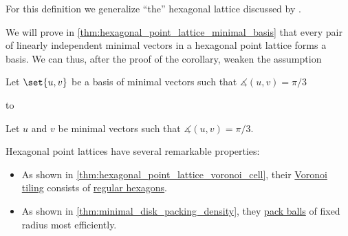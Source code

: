 \begin{comments}
  \item For this definition we generalize \enquote{the} hexagonal lattice discussed by \textcite[\S 6.2]{ConwaySloane1998SpherePackings}.

  \item We will prove in \cref{thm:hexagonal_point_lattice_minimal_basis} that every pair of linearly independent minimal vectors in a hexagonal point lattice forms a basis. We can thus, after the proof of the corollary, weaken the assumption
  \begin{displayquote}
    Let \( \set{ u, v } \) be a basis of minimal vectors such that \( \measuredangle(u, v) = \pi / 3 \)
  \end{displayquote}
  to
  \begin{displayquote}
    Let \( u \) and \( v \) be minimal vectors such that \( \measuredangle(u, v) = \pi / 3 \).
  \end{displayquote}

  \item Hexagonal point lattices have several remarkable properties:
  \begin{itemize}
    \item As shown in \cref{thm:hexagonal_point_lattice_voronoi_cell}, their \hyperref[def:voronoi_tiling]{Voronoi tiling} consists of \hyperref[def:regular_polygon]{regular hexagons}.
    \item As shown in \cref{thm:minimal_disk_packing_density}, they \hyperref[def:lattice_ball_packing]{pack balls} of fixed radius most efficiently.
  \end{itemize}
\end{comments}

